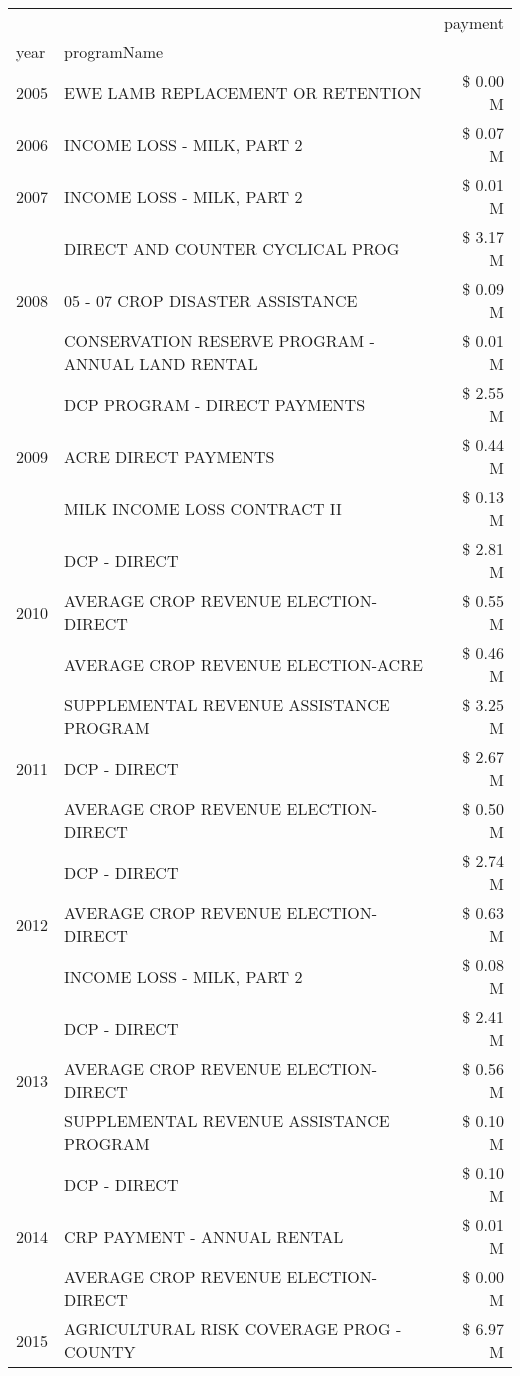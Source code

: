 \begin{tabular}{llr}
\toprule
 &  & payment \\
year & programName &  \\
\midrule
2005 & EWE LAMB REPLACEMENT OR RETENTION & \$ 0.00 M \\
\cline{1-3}
2006 & INCOME LOSS - MILK, PART 2 & \$ 0.07 M \\
\cline{1-3}
2007 & INCOME LOSS - MILK, PART 2 & \$ 0.01 M \\
\cline{1-3}
\multirow[t]{3}{*}{2008} & DIRECT AND COUNTER CYCLICAL PROG & \$ 3.17 M \\
 & 05 - 07 CROP DISASTER ASSISTANCE & \$ 0.09 M \\
 & CONSERVATION RESERVE PROGRAM - ANNUAL LAND RENTAL & \$ 0.01 M \\
\cline{1-3}
\multirow[t]{3}{*}{2009} & DCP PROGRAM - DIRECT PAYMENTS & \$ 2.55 M \\
 & ACRE DIRECT PAYMENTS & \$ 0.44 M \\
 & MILK INCOME LOSS CONTRACT II & \$ 0.13 M \\
\cline{1-3}
\multirow[t]{3}{*}{2010} & DCP - DIRECT & \$ 2.81 M \\
 & AVERAGE CROP REVENUE ELECTION-DIRECT & \$ 0.55 M \\
 & AVERAGE CROP REVENUE ELECTION-ACRE & \$ 0.46 M \\
\cline{1-3}
\multirow[t]{3}{*}{2011} & SUPPLEMENTAL REVENUE ASSISTANCE PROGRAM & \$ 3.25 M \\
 & DCP - DIRECT & \$ 2.67 M \\
 & AVERAGE CROP REVENUE ELECTION-DIRECT & \$ 0.50 M \\
\cline{1-3}
\multirow[t]{3}{*}{2012} & DCP - DIRECT & \$ 2.74 M \\
 & AVERAGE CROP REVENUE ELECTION-DIRECT & \$ 0.63 M \\
 & INCOME LOSS - MILK, PART 2 & \$ 0.08 M \\
\cline{1-3}
\multirow[t]{3}{*}{2013} & DCP - DIRECT & \$ 2.41 M \\
 & AVERAGE CROP REVENUE ELECTION-DIRECT & \$ 0.56 M \\
 & SUPPLEMENTAL REVENUE ASSISTANCE PROGRAM & \$ 0.10 M \\
\cline{1-3}
\multirow[t]{3}{*}{2014} & DCP - DIRECT & \$ 0.10 M \\
 & CRP PAYMENT - ANNUAL RENTAL & \$ 0.01 M \\
 & AVERAGE CROP REVENUE ELECTION-DIRECT & \$ 0.00 M \\
\cline{1-3}
\multirow[t]{3}{*}{2015} & AGRICULTURAL RISK COVERAGE PROG - COUNTY & \$ 6.97 M \\

\end{tabular}
